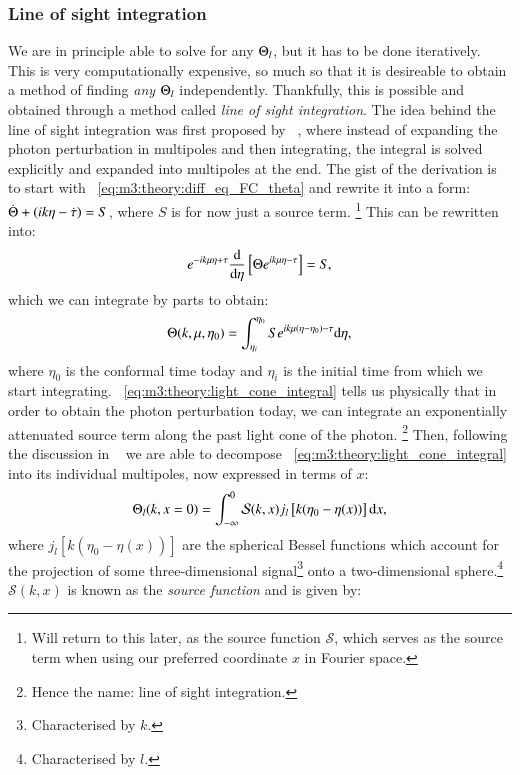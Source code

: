 \subsubsection{Line of sight integration}
    We are in principle able to solve for any $\Theta_l$, but it has to be done iteratively. This is very computationally expensive, so much so that it is desireable to obtain a method of finding \textit{any} $\Theta_l$ independently. Thankfully, this is possible and obtained through a method called \textit{line of sight integration}. The idea behind the line of sight integration was first proposed by ~\cite{Seljak_1996}, where instead of expanding the photon perturbation in multipoles and then integrating, the integral is solved explicitly and expanded into multipoles at the end. The gist of the derivation is to start with ~\cref{eq:m3:theory:diff_eq_FC_theta} and rewrite it into a form: $\dot{\Theta}+(ik\eta-\dot{\tau}) = S$, where $S$ is for now just a source term. \footnote{Will return to this later, as the source function $\mathcal{S}$, which serves as the source term when using our preferred coordinate $x$ in Fourier space.} This can be rewritten into:
    \begin{equation}
        e^{-ik\mu\eta+\tau}\dv{}{\eta}\left[\Theta e^{ik\mu\eta-\tau}\right] = S,
    \end{equation} 
    which we can integrate by parts to obtain:
    \begin{equation}\label{eq:m3:theory:light_cone_integral}
        \Theta(k,\mu,\eta_0) = \int_{\eta_i}^{\eta_0} S e^{ik\mu(\eta-\eta_0)-\tau}\mathrm{d}\eta,
    \end{equation}
    where $\eta_0$ is the conformal time today and $\eta_i$ is the initial time from which we start integrating. ~\cref{eq:m3:theory:light_cone_integral} tells us physically that in order to obtain the photon perturbation today, we can integrate an exponentially attenuated source term along the past light cone of the photon. \footnote{Hence the name: line of sight integration.} Then, following the discussion in ~\cite[Eq. 9.49 - Eq. 9.54]{dodelson2020modern} we are able to decompose ~\cref{eq:m3:theory:light_cone_integral} into its individual multipoles, now expressed in terms of $x$:
    \begin{equation}\label{eq:m3:theory:line_of_sight_integral_definition}
        \Theta_l(k,x=0) = \int_{-\infty}^0 \mathcal{S}(k,x)j_l\left[k(\eta_0-\eta(x))\right]\mathrm{d} x,
    \end{equation}
    where $j_l\left[k(\eta_0-\eta(x))\right]$ are the spherical Bessel functions which account for the projection of some three-dimensional signal\footnote{Characterised by $k$.} onto a two-dimensional sphere.\footnote{Characterised by $l$.} $\mathcal{S}(k,x)$ is known as the \textit{source function} and is given by:
